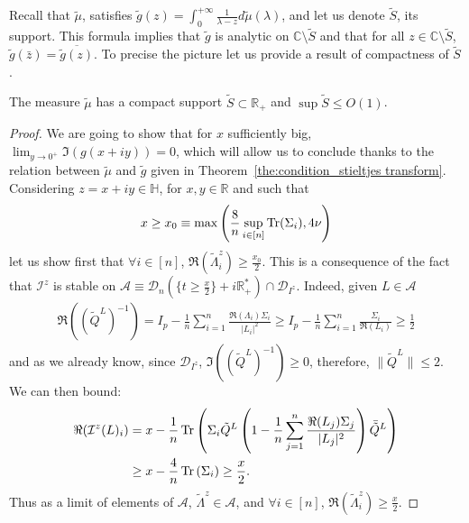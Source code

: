 \documentclass[a4papaer, titlepage]{book}
\begin{document}
Recall that $\tilde \mu$, satisfies $\tilde g(z) = \int_0^{+\infty} \frac{1}{\lambda - z} d\tilde \mu(\lambda)$, and let us denote $\tilde S$, its support. This formula implies that $\tilde g$ is analytic on $\mathbb C \setminus \tilde S$ and that for all $z \in \mathbb C \setminus \tilde S$, $\tilde g(\bar z) = \overline{\tilde g(z)}$. 
To precise the picture let us provide a result of compactness of $\tilde S$.

\begin{proposition}\label{pro:mu_support_compact}
  The measure $\tilde \mu$ has a compact support $\tilde S \subset \mathbb R_ +$ and $\sup \tilde S \leq O(1)$.
\end{proposition}
  \begin{proof}
  We are going to show that for $x$ sufficiently big, $\lim_{y \to 0^+}\Im(g(x+iy)) = 0$, which will allow us to conclude thanks to the relation between $\tilde \mu$ and $\tilde g$ given in Theorem~\ref{the:condition_stieltjes transform}.
  Considering $z = x + iy \in \mathbb H$, for $x,y \in \mathbb R$ and such that
  \begin{align*}
     x\geq x_0 \equiv \max \left(\frac{8}{n}\sup_{i\in [n]} \operatorname{Tr}(\Sigma_i),4\nu\right)
   \end{align*} 
   let us show first that $\forall i \in [n]$, $\Re(\tilde \Lambda_i^z)\geq \frac{x_0}2$. This is a consequence of the fact that $\mathcal I^z$ is stable on $\mathcal A \equiv \mathcal D_n(\{t \geq \frac{x}{2}\} + i \mathbb R_+^*) \cap \mathcal D_{I^z}$. 
   Indeed, given $L \in \mathcal A$
    \begin{align*}
      \Re \left( (\tilde Q^L)^{-1}\right) 
      = I_p - \frac{1}{n } \sum_{i=1}^n \frac{\Re(\Lambda_i)\Sigma_i}{|L_i|^2} 
      \geq I_p - \frac{1}{n } \sum_{i=1}^n \frac{\Sigma_i}{\Re(L_i)} \geq \frac{1}{2}
    \end{align*}
    and as we already know, since $\mathcal D_{I^z}$, $\Im \left( (\tilde Q^L)^{-1}\right) \geq 0$, therefore, $\|\tilde Q^L\| \leq 2$. We can then bound: 
  \begin{align*}
    \Re(\mathcal I^z(L)_i) 
    &= x - \frac{1}{n} \operatorname{Tr} \left(\Sigma_i{\tilde Q}^L \left(1 - \frac{1}{n} \sum_{j=1}^n \frac{\Re(L_j)\Sigma_j}{|L_j|^2}\right)\bar {\tilde Q}^L\right)\\
    &\geq x - \frac{4}{n} \operatorname{Tr} \left(\Sigma_i\right) \geq \frac{x}{2}.
  \end{align*}
  Thus as a limit of elements of $\mathcal A$, $\tilde \Lambda^z \in \mathcal A$, and $\forall i \in [n]$, $\Re(\tilde \Lambda^z_i) \geq \frac{x}2$. 


\end{proof}
\end{document}
